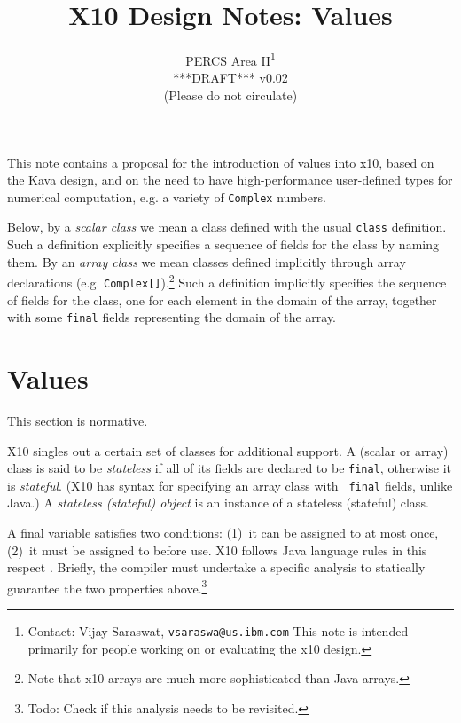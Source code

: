 \documentclass{article}
\def\ccfont{\sf}
\def\x10{{\ccfont x10}}
\def\X10{{\ccfont X10}}
\def\java{{\sc Java}}
\begin{document}
\title{\X10{} Design Notes: Values\\
}
\author{{\sc PERCS} Area II\footnote{Contact: Vijay Saraswat, {\tt vsaraswa@us.ibm.com} This note is intended primarily for people working on or evaluating the \x10{} design.}\\ 
{\sc ****DRAFT*** v0.02}\\ 
(Please do not circulate)
}

\maketitle

This note contains a proposal for the introduction of values into
\x10, based on the {\sc Kava} design, and on the need to have
high-performance user-defined types for numerical computation, e.g.{}
a variety of {\tt Complex} numbers.

Below, by a {\em scalar class} we mean a class defined with the usual
{\tt class} definition. Such a definition explicitly specifies a
sequence of fields for the class by naming them.  By an {\em array
class} we mean classes defined implicitly through array declarations
(e.g. {\tt Complex[]}).\footnote{Note that \x10{} arrays are much more
sophisticated than \java{} arrays.} Such a definition implicitly
specifies the sequence of fields for the class, one for each element
in the domain of the array, together with some {\tt final} fields
representing the domain of the array.

\section{Values} 
This section is normative.

\X10{} singles out a certain set of classes for additional support. A
(scalar or array) class is said to be {\em stateless} if all of its
fields are declared to be {\tt final}, otherwise it is {\em
stateful}. (\X10{} has syntax for specifying an array class with {\tt
final} fields, unlike \java.) A {\em stateless (stateful) object} is
an instance of a stateless (stateful) class.

A final variable satisfies two conditions: (1)~it can be assigned to
at most once, (2)~it must be assigned to before use. \X10{} follows
\java{} language rules in this respect \cite[Sections
4.5.4,8.3.1.2,Chapter 16]{jls}. Briefly, the compiler must undertake a
specific analysis to statically guarantee the two properties above.\footnote{Todo: Check if this analysis needs to be revisited.}
\end{document}
